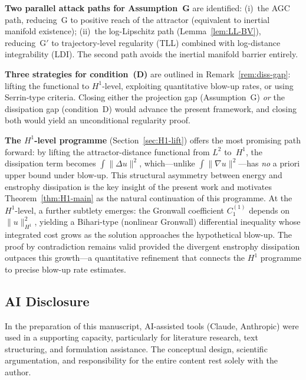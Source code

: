 \documentclass[12pt,a4paper]{article}
\theoremstyle{definition}
\theoremstyle{plain}
\theoremstyle{remark}
\begin{document}
\medskip\noindent
\textbf{Two parallel attack paths for Assumption~G} are identified:
(i)~the AGC path, reducing~G to positive reach of the attractor
(equivalent to inertial manifold existence);
(ii)~the log-Lipschitz path (Lemma~\ref{lem:LL-BV}), reducing~G$'$ to
trajectory-level regularity (TLL) combined with log-distance
integrability (LDI).  The second path avoids the inertial manifold
barrier entirely.

\medskip\noindent
\textbf{Three strategies for condition~(D)} are outlined in
Remark~\ref{rem:diss-gap}: lifting the functional to $H^1$-level,
exploiting quantitative blow-up rates, or using Serrin-type criteria.
Closing either the projection gap (Assumption~G) \emph{or} the
dissipation gap (condition~D) would advance the present framework,
and closing both would yield an unconditional regularity proof.

\medskip\noindent
\textbf{The $H^1$-level programme} (Section~\ref{sec:H1-lift})
offers the most promising path forward: by lifting the
attractor-distance functional from $L^2$ to~$H^1$, the
dissipation term becomes $\int\|\Delta u\|^2$, which---unlike
$\int\|\nabla u\|^2$---has \emph{no} a priori upper bound
under blow-up.  This structural asymmetry between energy and
enstrophy dissipation is the key insight of the present work
and motivates Theorem~\ref{thm:H1-main} as the natural
continuation of this programme.
At the $H^1$-level, a further subtlety emerges: the Gronwall
coefficient $C_1^{(1)}$ depends on $\|u\|_{H^1}^2$, yielding a
Bihari-type (nonlinear Gronwall) differential inequality whose
integrated cost grows as the solution approaches the hypothetical
blow-up.  The proof by contradiction remains valid provided the
divergent enstrophy dissipation outpaces this growth---a
quantitative refinement that connects the $H^1$ programme to
precise blow-up rate estimates.

\subsection*{AI Disclosure}
In the preparation of this manuscript, AI-assisted tools (Claude, Anthropic)
were used in a supporting capacity, particularly for literature research,
text structuring, and formulation assistance.  The conceptual design,
scientific argumentation, and responsibility for the entire content
rest solely with the author.
\end{document}
